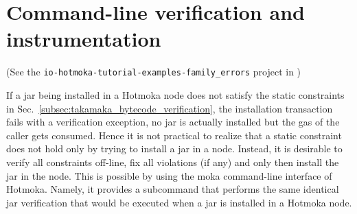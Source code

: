 \section{Command-line verification and instrumentation}

\begin{center}
(See the \texttt{io-hotmoka-tutorial-examples-family\_errors} project in \hotmokaRepo{})
\end{center}

If a jar being installed in a Hotmoka node does not satisfy the static
constraints in Sec.~\ref{subsec:takamaka_bytecode_verification}, the installation transaction fails with
a verification exception, no jar is actually installed but the gas of the
caller gets consumed. Hence it is not practical to realize that a
static constraint does not hold only by trying to install a jar in a node.
Instead, it is desirable to verify all constraints off-line, fix all
violations (if any) and only then install the jar in the node. This is
possible by using the moka command-line interface of Hotmoka.
Namely, it provides a subcommand that performs the same identical jar
verification that would be executed when a jar is
installed in a Hotmoka node.

